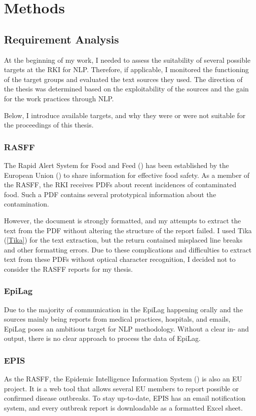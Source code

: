 \chapter{Methods}

\section{Requirement Analysis}
  At the beginning of my work, I needed to assess the suitability of several possible targets at the RKI for NLP.
  Therefore, if applicable, I monitored the functioning of the target groups and evaluated the text sources they used.
  The direction of the thesis was determined based on the exploitability of the sources and the gain for the work practices through NLP.

  Below, I introduce available targets, and why they were or were not suitable for the proceedings of this thesis.

\subsection{RASFF}
  The Rapid Alert System for Food and Feed () has been established by the European Union () to share information for effective food safety.
  As a member of the RASFF, the RKI receives PDFs about recent incidences of contaminated food.
  Such a PDF contains several prototypical information about the contamination.

  However, the document is strongly formatted, and my attempts to extract the text from the PDF without altering the structure of the report failed.
  I used Tika (\ref{Tika}) for the text extraction, but the return contained misplaced line breaks and other formatting errors.
  Due to these complications and difficulties to extract text from these PDFs without optical character recognition, I decided not to consider the RASFF reports for my thesis.

\subsection{EpiLag}
  Due to the majority of communication in the EpiLag happening orally and the sources mainly being reports from medical practices, hospitals, and emails, EpiLag poses an ambitious target for NLP methodology.
  Without a clear in- and output, there is no clear approach to process the data of EpiLag.

\subsection{EPIS}
  As the RASFF, the Epidemic Intelligence Information System () is also an EU project.
  It is a web tool that allows several EU members to report possible or confirmed disease outbreaks.
  To stay up-to-date, EPIS has an email notification system, and every outbreak report is downloadable as a formatted Excel sheet.

